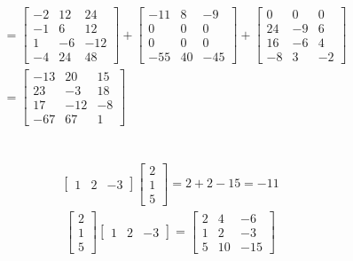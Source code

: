 \documentclass{article}
\begin{document}
\begin{align*}
     & =
    \begin{bmatrix}
        -2 & 12 & 24  \\
        -1 & 6  & 12  \\
        1  & -6 & -12 \\
        -4 & 24 & 48
    \end{bmatrix} +
    \begin{bmatrix}
        -11 & 8  & -9  \\
        0   & 0  & 0   \\
        0   & 0  & 0   \\
        -55 & 40 & -45
    \end{bmatrix} +
    \begin{bmatrix}
        0  & 0  & 0  \\
        24 & -9 & 6  \\
        16 & -6 & 4  \\
        -8 & 3  & -2
    \end{bmatrix} \\
     & =
    \begin{bmatrix}
        -13 & 20  & 15 \\
        23  & -3  & 18 \\
        17  & -12 & -8 \\
        -67 & 67  & 1
    \end{bmatrix} \\
\end{align*}

\subsection{}
\begin{align*}
    \begin{bmatrix}
        1 & 2 & -3
    \end{bmatrix}
    \begin{bmatrix}
        2 \\
        1 \\
        5
    \end{bmatrix}
    = 2 + 2 - 15 = -11
\end{align*}
\begin{align*}
    \begin{bmatrix}
        2 \\
        1 \\
        5
    \end{bmatrix}
    \begin{bmatrix}
        1 & 2 & -3
    \end{bmatrix}
    =
    \begin{bmatrix}
        2 & 4  & -6  \\
        1 & 2  & -3  \\
        5 & 10 & -15
    \end{bmatrix}
\end{align*}
\end{document}
